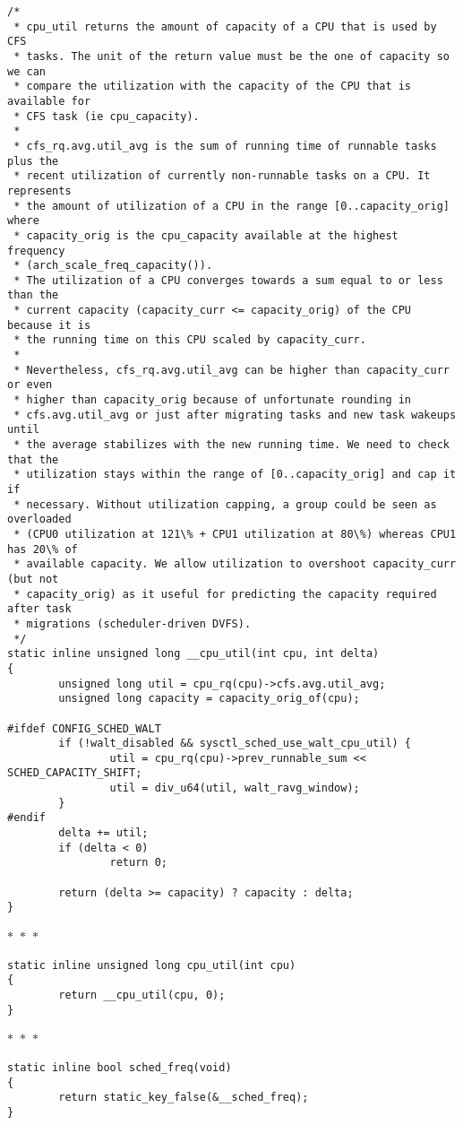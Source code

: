 \documentclass{article}
\newcommand{\divider}{{\begin{center}
  $\ast$~$\ast$~$\ast$
\end{center}}}
\begin{document}
\begin{verbatim}
/*
 * cpu_util returns the amount of capacity of a CPU that is used by CFS
 * tasks. The unit of the return value must be the one of capacity so we can
 * compare the utilization with the capacity of the CPU that is available for
 * CFS task (ie cpu_capacity).
 *
 * cfs_rq.avg.util_avg is the sum of running time of runnable tasks plus the
 * recent utilization of currently non-runnable tasks on a CPU. It represents
 * the amount of utilization of a CPU in the range [0..capacity_orig] where
 * capacity_orig is the cpu_capacity available at the highest frequency
 * (arch_scale_freq_capacity()).
 * The utilization of a CPU converges towards a sum equal to or less than the
 * current capacity (capacity_curr <= capacity_orig) of the CPU because it is
 * the running time on this CPU scaled by capacity_curr.
 *
 * Nevertheless, cfs_rq.avg.util_avg can be higher than capacity_curr or even
 * higher than capacity_orig because of unfortunate rounding in
 * cfs.avg.util_avg or just after migrating tasks and new task wakeups until
 * the average stabilizes with the new running time. We need to check that the
 * utilization stays within the range of [0..capacity_orig] and cap it if
 * necessary. Without utilization capping, a group could be seen as overloaded
 * (CPU0 utilization at 121\% + CPU1 utilization at 80\%) whereas CPU1 has 20\% of
 * available capacity. We allow utilization to overshoot capacity_curr (but not
 * capacity_orig) as it useful for predicting the capacity required after task
 * migrations (scheduler-driven DVFS).
 */
static inline unsigned long __cpu_util(int cpu, int delta)
{
        unsigned long util = cpu_rq(cpu)->cfs.avg.util_avg;
        unsigned long capacity = capacity_orig_of(cpu);

#ifdef CONFIG_SCHED_WALT
        if (!walt_disabled && sysctl_sched_use_walt_cpu_util) {
                util = cpu_rq(cpu)->prev_runnable_sum << SCHED_CAPACITY_SHIFT;
                util = div_u64(util, walt_ravg_window);
        }
#endif
        delta += util;
        if (delta < 0)
                return 0;

        return (delta >= capacity) ? capacity : delta;
}
\end{verbatim}
\divider
\begin{verbatim}
static inline unsigned long cpu_util(int cpu)
{
        return __cpu_util(cpu, 0);
}
\end{verbatim}
\divider
\begin{verbatim}
static inline bool sched_freq(void)
{
        return static_key_false(&__sched_freq);
}
\end{verbatim}
\end{document}
